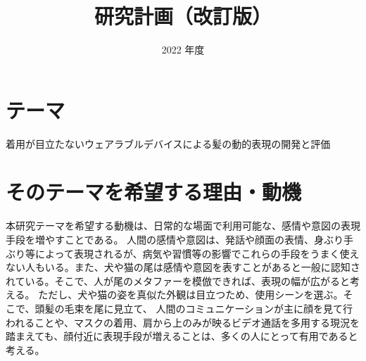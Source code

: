 \documentclass[a4paper]{jsarticle}
\begin{document}
\masterthesis %


\title{研究計画（改訂版）}
\date{2022 年度}
\maketitle


\setcounter{page}{1} %



\newpage

\setcounter{page}{1} %


\section{テーマ}
着用が目立たないウェアラブルデバイスによる髪の動的表現の開発と評価

\section{そのテーマを希望する理由・動機}
本研究テーマを希望する動機は、日常的な場面で利用可能な、感情や意図の表現手段を増やすことである。
人間の感情や意図は、発話や顔面の表情、身ぶり手ぶり等によって表現されるが、病気や習慣等の影響でこれらの手段をうまく使えない人もいる。また、犬や猫の尾は感情や意図を表すことがあると一般に認知されている。そこで、人が尾のメタファーを模倣できれば、表現の幅が広がると考える。
ただし、犬や猫の姿を真似た外観は目立つため、使用シーンを選ぶ。そこで、頭髪の毛束を尾に見立て、
人間のコミュニケーションが主に顔を見て行われることや、マスクの着用、肩から上のみが映るビデオ通話を多用する現況を踏まえても、顔付近に表現手段が増えることは、多くの人にとって有用であると考える。
\end{document}
